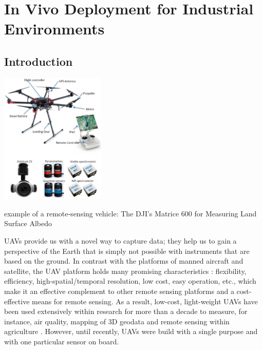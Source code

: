 \chapter{In Vivo Deployment for Industrial Environments}\label{c3}





\section{Introduction}


\begin{marginfigure}%
  \includegraphics[width=5cm]{images/stage_sota/albedo_drone.png}
  \caption{example of a remote-sensing vehicle: The DJI's Matrice 600 for Measuring Land Surface Albedo \cite{land_surface_albedo}}
  \label{fig:dji}
\end{marginfigure}
UAVs provide us with a novel way to capture data; they help us to gain a perspective of the Earth that is simply not possible with instruments that are based on the ground. In contrast with the platforms of manned aircraft and satellite, the UAV
platform holds many promising characteristics \cite{xiang_xia_zhang_2020}: flexibility, efficiency, high-spatial/temporal resolution, low cost, easy operation, etc., which make it an effective complement to other remote sensing platforms and a cost-effective means for remote sensing. As a result, low-cost, light-weight UAVs have been used extensively within research for more than a decade to measure, for instance, air quality, mapping of 3D geodata and remote sensing within agriculture \cite{metrology_survey}. However, until recently, UAVs were build with a single purpose and with one particular sensor on board.


